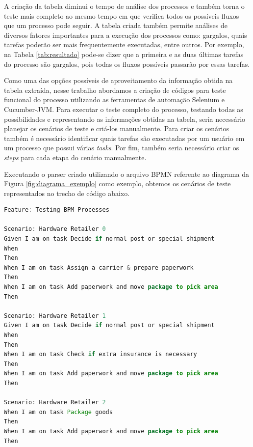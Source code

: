 \documentclass[12pt]{article}
\begin{document}
A criação da tabela diminui o tempo de análise dos processos e também torna o teste mais completo ao mesmo tempo em que verifica todos os possíveis fluxos que um processo pode seguir. A tabela criada também permite análises de diversos fatores importantes para a execução dos processos como: gargalos, quais tarefas poderão ser mais frequentemente executadas, entre outros. Por exemplo, na Tabela \ref{tab:resultado} pode-se dizer que a primeira e as duas últimas tarefas do processo são gargalos, pois todas os fluxos possíveis passarão por essas tarefas. 

Como uma das opções possíveis de aproveitamento da informação obtida na tabela extraída, nesse trabalho abordamos a criação de códigos para teste funcional do processo utilizando as ferramentas de automação Selenium e Cucumber-JVM. Para executar o teste completo do processo, testando todas as possibilidades e representando as informações obtidas na tabela, seria necessário planejar os cenários de teste e criá-los manualmente. Para criar os cenários também é necessário identificar quais tarefas são executadas por um usuário em um processo que possui várias \emph{tasks}. Por fim, também seria necessário criar os \emph{steps} para cada etapa do cenário manualmente.
 


Executando o parser criado utilizando o arquivo BPMN referente ao diagrama da Figura \ref{fig:diagrama_exemplo} como exemplo, obtemos os cenários de teste representados no trecho de código abaixo. 


\begin{lstlisting}[language=Java]
Feature: Testing BPM Processes  
 
Scenario: Hardware Retailer 0 
Given I am on task Decide if normal post or special shipment 
When 
Then 
When I am on task Assign a carrier & prepare paperwork 
Then 
When I am on task Add paperwork and move package to pick area 
Then 
 
Scenario: Hardware Retailer 1 
Given I am on task Decide if normal post or special shipment 
When 
Then 
When I am on task Check if extra insurance is necessary 
Then 
When I am on task Add paperwork and move package to pick area 
Then 
 
Scenario: Hardware Retailer 2
When I am on task Package goods 
Then 
When I am on task Add paperwork and move package to pick area 
Then 

\end{lstlisting}
\end{document}
